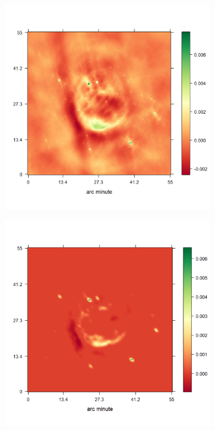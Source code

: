 \begin{figure}[h!]
	\centering
	\begin{subfigure}[b]{0.32\linewidth}
		\includegraphics[width=\linewidth, trim={20px 30px 75px 52px}, clip]{./chapters/05.results/g55/raw_model.png}
	\end{subfigure}
	\begin{subfigure}[b]{0.32\linewidth}
		\includegraphics[width=\linewidth, trim={20px 30px 75px 52px}, clip]{./chapters/05.results/g55/clean_model.png}

\end{subfigure}
\end{figure}
